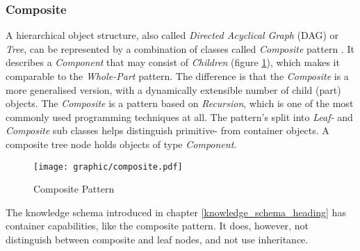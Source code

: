 %
%
%
%
%
%
%

\subsubsection{Composite}
\label{composite_heading}

A hierarchical object structure, also called \emph{Directed Acyclical Graph}
(DAG) or \emph{Tree}, can be represented by a combination of classes called
\emph{Composite} pattern \cite{gamma1995}. It describes a \emph{Component} that
may consist of \emph{Children} (figure \ref{composite_figure}), which makes it
comparable to the \emph{Whole-Part} pattern. The difference is that the
\emph{Composite} is a more generalised version, with a dynamically extensible
number of child (part) objects. The \emph{Composite} is a pattern based on
\emph{Recursion}, which is one of the most commonly used programming techniques
at all. The pattern's split into \emph{Leaf-} and \emph{Composite} sub classes
helps distinguish primitive- from container objects. A composite tree node
holds objects of type \emph{Component}.

\begin{figure}[ht]
    \begin{center}
        \texttt{[image: graphic/composite.pdf]}
        \caption{Composite Pattern}
        \label{composite_figure}
    \end{center}
\end{figure}

The knowledge schema introduced in chapter \ref{knowledge_schema_heading} has
container capabilities, like the composite pattern. It does, however, not
distinguish between composite and leaf nodes, and not use inheritance.
